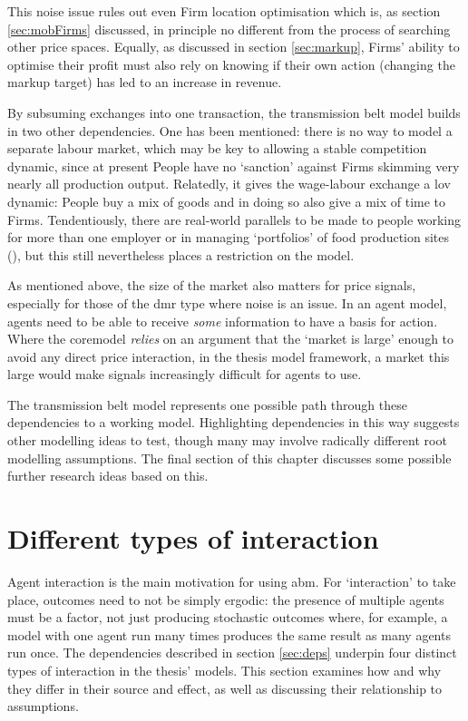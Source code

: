This noise issue rules out even Firm location optimisation which is, as section \ref{sec:mobFirms} discussed, in principle no different from the process of searching other price spaces. Equally, as discussed in section \ref{sec:markup}, Firms' ability to optimise their profit must also rely on knowing if their own action (changing the markup target) has led to an increase in revenue.

By subsuming exchanges into one transaction, the transmission belt model builds in two other dependencies. One has been mentioned: there is no way to model a separate labour market, which may be key to allowing a stable competition dynamic, since at present People have no `sanction' against Firms skimming very nearly all production output. Relatedly, it gives the wage-labour exchange a \gls{lov} dynamic: People buy a mix of goods and in doing so also give a mix of time to Firms. Tendentiously, there are real-world parallels to be made to people working for more than one employer or in managing `portfolios' of food production sites (\citealt{rose_who_1993}), but this still nevertheless places a restriction on the model.

As mentioned above, the size of the market also matters for price signals, especially for those of the \gls{dmr} type where noise is an issue. In an agent model, agents need to be able to receive \emph{some} information to have a basis for action. Where the \gls{coremodel} \emph{relies} on an argument that the `market is large' enough to avoid any direct price interaction, in the thesis model framework, a market this large would make signals increasingly difficult for agents to use. 

The transmission belt model represents one possible path through these dependencies to a working model. Highlighting dependencies in this way suggests other modelling ideas to test, though many may involve radically different root modelling assumptions. The final section of this chapter discusses some possible further research ideas based on this.

\section{Different types of interaction \label{sec:coordoverview}}

Agent interaction is the main motivation for using \gls{abm}. For `interaction' to take place, outcomes need to not be simply ergodic: the presence of multiple agents must be a factor, not just producing stochastic outcomes where, for example, a model with one agent run many times produces the same result as many agents run once. The dependencies described in section \ref{sec:deps} underpin four distinct types of interaction in the thesis' models. This section examines how and why they differ in their source and effect, as well as discussing their relationship to assumptions.

